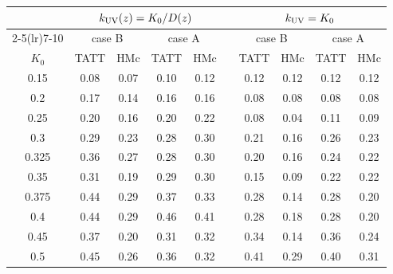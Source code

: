 \begin{tabular}{c cc cc c cc cc}\toprule
 & \multicolumn{4}{c}{$k_{\rm UV}(z) = K_0/D(z)$} & & \multicolumn{4}{c}{$k_{\rm UV} = K_0$}\\
\cmidrule(lr){2-5}\cmidrule(lr){7-10}
 & \multicolumn{2}{c}{case B} & \multicolumn{2}{c}{case A} & & \multicolumn{2}{c}{case B} & \multicolumn{2}{c}{case A}\\
$K_0$ & TATT & HMc & TATT & HMc & & TATT & HMc & TATT & HMc\\ \midrule
0.15 & 0.08 & 0.07 & 0.10 & 0.12 &  & 0.12 & 0.12 & 0.12 & 0.12\\
0.2 & 0.17 & 0.14 & 0.16 & 0.16 &  & 0.08 & 0.08 & 0.08 & 0.08\\
0.25 & 0.20 & 0.16 & 0.20 & 0.22 &  & 0.08 & 0.04 & 0.11 & 0.09\\
0.3 & 0.29 & 0.23 & 0.28 & 0.30 &  & 0.21 & 0.16 & 0.26 & 0.23\\
0.325 & \textcolor{red!70!black}{0.36} & 0.27 & 0.28 & \textcolor{red!70!black}{0.30} &  & 0.20 & 0.16 & 0.24 & 0.22\\
0.35 & \textcolor{red!70!black}{0.31} & 0.19 & 0.29 & 0.30 &  & 0.15 & 0.09 & 0.22 & 0.22\\
0.375 & \textcolor{red!70!black}{0.44} & 0.29 & \textcolor{red!70!black}{0.37} & \textcolor{red!70!black}{0.33} &  & 0.28 & 0.14 & 0.28 & 0.20\\
0.4 & \textcolor{red!70!black}{0.44} & 0.29 & \textcolor{red!70!black}{0.46} & \textcolor{red!70!black}{0.41} &  & 0.28 & 0.18 & 0.28 & 0.20\\
0.45 & \textcolor{red!70!black}{0.37} & 0.20 & \textcolor{red!70!black}{0.31} & \textcolor{red!70!black}{0.32} &  & \textcolor{red!70!black}{0.34} & 0.14 & \textcolor{red!70!black}{0.36} & 0.24\\
0.5 & \textcolor{red!70!black}{0.45} & 0.26 & \textcolor{red!70!black}{0.36} & \textcolor{red!70!black}{0.32} &  & \textcolor{red!70!black}{0.41} & 0.29 & \textcolor{red!70!black}{0.40} & \textcolor{red!70!black}{0.31}\\
\bottomrule\end{tabular}
